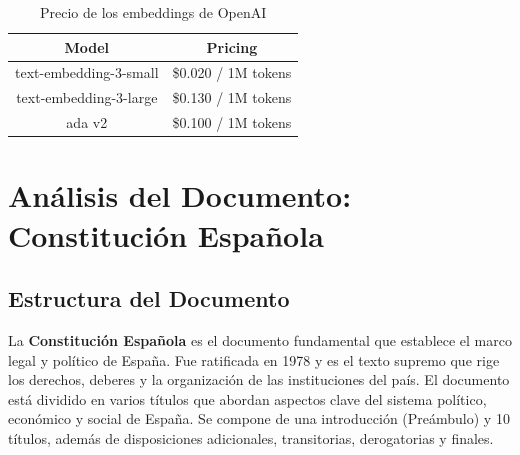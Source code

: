 \begin{table}[h]
\centering
\begin{tabular}{|c|c|}
\hline
\textbf{Model} & \textbf{Pricing} \\ \hline
text-embedding-3-small & \$0.020 / 1M tokens \\ \hline
text-embedding-3-large & \$0.130 / 1M tokens \\ \hline
ada v2 & \$0.100 / 1M tokens \\ \hline
\end{tabular}
\caption{Precio de los embeddings de OpenAI \citep{openai}}
\label{tab:pricing}
\end{table}


\section{Análisis del Documento: Constitución Española}

\subsection{Estructura del Documento}

La \textbf{Constitución Española} es el documento fundamental que establece el marco legal y político de España. Fue ratificada en 1978 y es el texto supremo que rige los derechos, deberes y la organización de las instituciones del país. El documento está dividido en varios títulos que abordan aspectos clave del sistema político, económico y social de España. Se compone de una introducción (Preámbulo) y 10 títulos, además de disposiciones adicionales, transitorias, derogatorias y finales.

